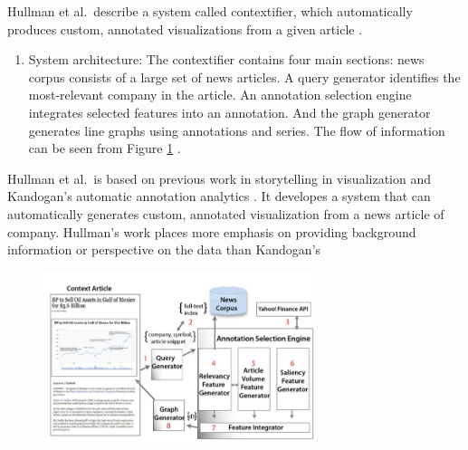 \documentclass{egpubl}
\begin{document}
Hullman et al.\ describe a system called contextifier, which automatically produces custom, annotated visualizations from a given article \cite{hullman2013}. 
\begin{enumerate}
\item System architecture: The contextifier contains four main sections: news corpus consists of a large set of news articles. A query generator identifies the most-relevant company in the article. An annotation selection engine integrates selected features into an annotation. And the graph generator generates line graphs using annotations and series. The flow of information can be seen from Figure \ref{fig:hullman2013} \cite{hullman2013}.
\end{enumerate}
Hullman et al.\ is based on previous work in storytelling in visualization \cite{segal} and Kandogan's automatic annotation analytics \cite{kandogan2012}. It developes a system that can automatically generates custom, annotated visualization from a news article of company. Hullman's work places more emphasis on providing background information or perspective on the data than Kandogan's \cite{kandogan2012}
\begin{figure}
\begingroup
\centering
\includegraphics[width=8cm]{./images/hullman2013}
\label{fig:hullman2013}
\endgroup
\end{figure}
\end{document}
